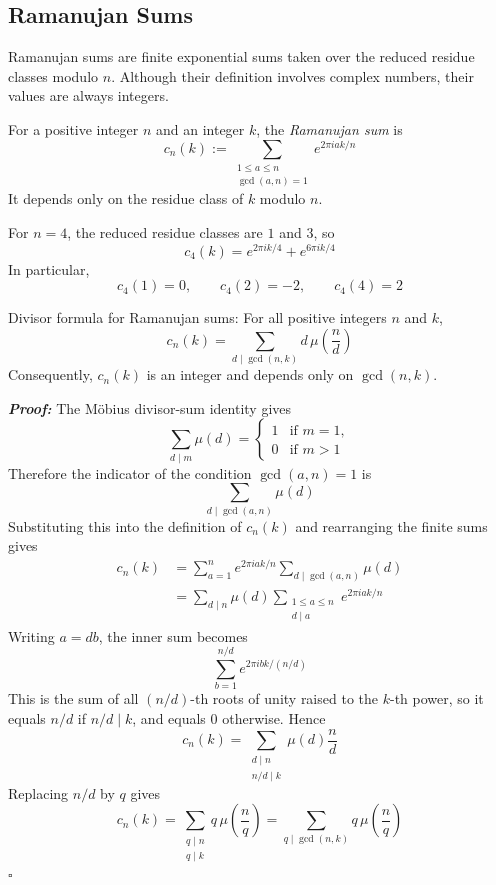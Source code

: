 \documentclass[a4paper,11pt,abstracton]{scrartcl}
\theoremstyle{dotlessP}
\theoremstyle{dotlessS}
\theoremstyle{remark}
\theoremstyle{definition}
\begin{document}
\subsection{Ramanujan Sums}

Ramanujan sums are finite exponential sums taken over the reduced
residue classes modulo $n$. Although their definition involves complex
numbers, their values are always integers.

\begin{definition_box}
For a positive integer $n$ and an integer $k$, the \emph{Ramanujan sum} is
\[
    c_n(k)
      :=\sum_{\substack{1\leq a\leq n\\ \gcd(a,n)=1}}
        e^{2\pi iak/n}
\]
It depends only on the residue class of $k$ modulo $n$.
\end{definition_box}

\begin{example_box}
For $n=4$, the reduced residue classes are $1$ and $3$, so
\[
    c_4(k)=e^{2\pi ik/4}+e^{6\pi ik/4}
\]
In particular,
\[
    c_4(1)=0,
    \qquad
    c_4(2)=-2,
    \qquad
    c_4(4)=2
\]
\end{example_box}

\begin{mainbox}{Divisor formula for Ramanujan sums:}
For all positive integers $n$ and $k$,
\[
    c_n(k)=\sum_{d\mid\gcd(n,k)}
      d\,\mu\!\left(\frac nd\right)
\]
Consequently, $c_n(k)$ is an integer and depends only on
$\gcd(n,k)$.
\end{mainbox}

\begin{claim_box}
\textbf{\textit{Proof:}}
The Möbius divisor-sum identity gives
\[
    \sum_{d\mid m}\mu(d)
      =
      \begin{cases}
          1 & \text{if $m=1$},\\
          0 & \text{if $m>1$}
      \end{cases}
\]
Therefore the indicator of the condition $\gcd(a,n)=1$ is
\[
    \sum_{d\mid\gcd(a,n)}\mu(d)
\]
Substituting this into the definition of $c_n(k)$ and rearranging the
finite sums gives
\begin{align*}
    c_n(k)
      &=\sum_{a=1}^{n}e^{2\pi iak/n}
        \sum_{d\mid\gcd(a,n)}\mu(d)\\
      &=\sum_{d\mid n}\mu(d)
        \sum_{\substack{1\leq a\leq n\\ d\mid a}}
        e^{2\pi iak/n}
\end{align*}
Writing $a=db$, the inner sum becomes
\[
    \sum_{b=1}^{n/d}e^{2\pi ibk/(n/d)}
\]
This is the sum of all $(n/d)$-th roots of unity raised to the
$k$-th power, so it equals $n/d$ if $n/d\mid k$, and equals $0$
otherwise. Hence
\[
    c_n(k)
      =\sum_{\substack{d\mid n\\ n/d\mid k}}
        \mu(d)\frac nd
\]
Replacing $n/d$ by $q$ gives
\[
    c_n(k)
      =\sum_{\substack{q\mid n\\ q\mid k}}
        q\,\mu\!\left(\frac nq\right)
      =\sum_{q\mid\gcd(n,k)}
        q\,\mu\!\left(\frac nq\right)
\]
\hfill$\square$
\end{claim_box}
\end{document}

